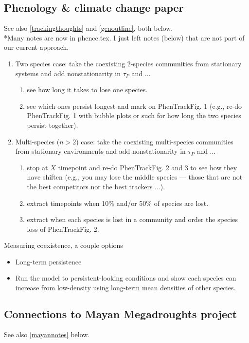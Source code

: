\documentclass[11pt,a4paper,oneside]{article}
\newenvironment{smitemize}{
\begin{itemize}
  \setlength{\itemsep}{1pt}
  \setlength{\parskip}{0pt}
  \setlength{\parsep}{0pt}}
{\end{itemize}
}
\begin{document}
\subsection{Phenology \& climate change paper}\label{phenCCpaper}
See also \ref{trackingthoughts} and \ref{genoutline}, both below.\\
*Many notes are now in phencc.tex. I just left notes (below) that are not part of our current approach.

\begin{enumerate}
\item Two species case: take the coexisting 2-species communities from stationary systems and add nonstationarity in $\tau_P$ and ...
\begin{enumerate}
\item see how long it takes to lose one species. 
\item see which ones persist longest and mark on PhenTrackFig. 1 (e.g., re-do PhenTrackFig. 1 with bubble plots or such for how long the two species persist together).
\end{enumerate}
\item Multi-species ($n>2$) case: take the coexisting multi-species communities from stationary environments and add nonstationarity in $\tau_P$ and ...
\begin{enumerate}
\item stop at $X$ timepoint and re-do PhenTrackFig. 2 and 3 to see how they have shiften (e.g., you may lose the middle species --- those that are not the best competitors nor the best trackers ...).
\item extract timepoints when 10\% and/or 50\% of species are lost. 
\item extract when each species is lost in a community and order the species loss of PhenTrackFig. 2.
\end{enumerate}
\end{enumerate}

Measuring coexistence, a couple options
\begin{smitemize}
\item Long-term persistence
\item Run the model to persistent-looking conditions and show each species can increase from low-density using long-term mean densities of other species.
\end{smitemize}

\subsection{Connections to Mayan Megadroughts project}
See also \ref{mayannotes} below.\\
\end{document}
